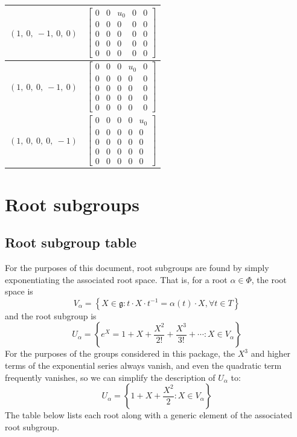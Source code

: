 \documentclass[11pt]{article}
\newcommand{\noi}{\noindent}
\newcommand{\inv}{^{-1}}
\newcommand{\lb}{\left\{}
\newcommand{\rb}{\right\}}
\newcommand{\frakg}{\mathfrak{g}}
\theoremstyle{definition}
\begin{document}
\begin{longtable}{|l|c|}
    \hline
    $\left( 1, \  0, \  -1, \  0, \  0\right)$ & ${\left[\begin{matrix}0 & 0 & u_{0} & 0 & 0\\0 & 0 & 0 & 0 & 0\\0 & 0 & 0 & 0 & 0\\0 & 0 & 0 & 0 & 0\\0 & 0 & 0 & 0 & 0\end{matrix}\right]}$ \\
    \hline
    $\left( 1, \  0, \  0, \  -1, \  0\right)$ & ${\left[\begin{matrix}0 & 0 & 0 & u_{0} & 0\\0 & 0 & 0 & 0 & 0\\0 & 0 & 0 & 0 & 0\\0 & 0 & 0 & 0 & 0\\0 & 0 & 0 & 0 & 0\end{matrix}\right]}$ \\
    \hline
    $\left( 1, \  0, \  0, \  0, \  -1\right)$ & ${\left[\begin{matrix}0 & 0 & 0 & 0 & u_{0}\\0 & 0 & 0 & 0 & 0\\0 & 0 & 0 & 0 & 0\\0 & 0 & 0 & 0 & 0\\0 & 0 & 0 & 0 & 0\end{matrix}\right]}$ \\
    \hline
\end{longtable}


\newpage
\section{Root subgroups}

\subsection{Root subgroup table}

\noi For the purposes of this document, root subgroups are found by simply exponentiating the associated root space. That is, for a root $\alpha \in \Phi$, the root space is
\[
	V_\alpha = \lb X \in \frakg : t \cdot X \cdot t \inv = \alpha(t) \cdot X, \forall t \in T \rb
\]
and the root subgroup is
\[
	U_\alpha = \lb e^X = 1 + X + \frac{X^2}{2!} + \frac{X^3}{3!} + \cdots : X \in V_\alpha \rb
\]
For the purposes of the groups considered in this package, the $X^3$ and higher terms of the exponential series always vanish, and even the quadratic term frequently vanishes, so we can simplify the description of $U_\alpha$ to:
\[
	U_\alpha = \lb 1 + X + \frac{X^2}{2} : X \in V_\alpha \rb
\]
The table below lists each root along with a generic element of the associated root subgroup.
\end{document}
